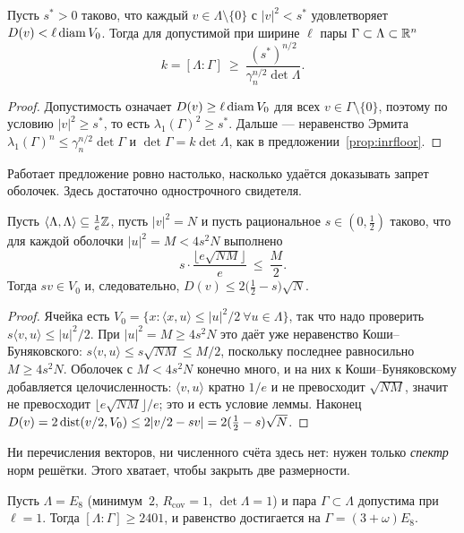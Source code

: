 \begin{proposition}\label{prop:shellfloor}
\stP{} Пусть $s^{\ast}>0$ таково, что каждый $v\in\Lambda\setminus\{0\}$ с
$|v|^2<s^{\ast}$ удовлетворяет $D(v)<\ell\operatorname{diam} V_0$. Тогда для допустимой при
ширине $\ell$ пары $\Gamma\subset\Lambda\subset\mathbb{R}^n$
\[
k=[\Lambda:\Gamma]\ \ge\ \frac{(s^{\ast})^{n/2}}{\gamma_n^{n/2}\det\Lambda}.
\]
\end{proposition}

\begin{proof}
Допустимость означает $D(v)\ge\ell\operatorname{diam} V_0$ для всех $v\in\Gamma\setminus\{0\}$,
поэтому по условию $|v|^2\ge s^{\ast}$, то есть
$\lambda_1(\Gamma)^2\ge s^{\ast}$. Дальше --- неравенство Эрмита
$\lambda_1(\Gamma)^n\le\gamma_n^{n/2}\det\Gamma$ и $\det\Gamma=k\det\Lambda$,
как в предложении~\ref{prop:inrfloor}.
\end{proof}

Работает предложение ровно настолько, насколько удаётся доказывать запрет
оболочек. Здесь достаточно однострочного свидетеля.

\begin{lemma}\label{lem:radial}
\stP{} Пусть $\langle\Lambda,\Lambda\rangle\subseteq\frac1e\mathbb{Z}$, пусть $|v|^2=N$
и пусть рациональное $s\in(0,\tfrac12)$ таково, что для каждой оболочки
$|u|^2=M<4s^2N$ выполнено
\[
s\cdot\frac{\bigl\lfloor e\sqrt{NM}\bigr\rfloor}{e}\ \le\ \frac M2 .
\]
Тогда $sv\in V_0$ и, следовательно,
$D(v)\le2\bigl(\tfrac12-s\bigr)\sqrt N$.
\end{lemma}

\begin{proof}
Ячейка есть $V_0=\{x:\langle x,u\rangle\le|u|^2/2\ \forall u\in\Lambda\}$, так
что надо проверить $s\langle v,u\rangle\le|u|^2/2$. При $|u|^2=M\ge4s^2N$ это
даёт уже неравенство Коши--Буняковского: $s\langle v,u\rangle\le s\sqrt{NM}\le
M/2$, поскольку последнее равносильно $M\ge4s^2N$. Оболочек с $M<4s^2N$ конечно
много, и на них к Коши--Буняковскому добавляется целочисленность: $\langle
v,u\rangle$ кратно $1/e$ и не превосходит $\sqrt{NM}$, значит не превосходит
$\lfloor e\sqrt{NM}\rfloor/e$; это и есть условие леммы. Наконец
$D(v)=2\operatorname{dist}(v/2,V_0)\le2|v/2-sv|=2(\tfrac12-s)\sqrt N$.
\end{proof}

Ни перечисления векторов, ни численного счёта здесь нет: нужен только
\emph{спектр} норм решётки. Этого хватает, чтобы закрыть две размерности.

\begin{keybox}
\begin{theorem}[$2401$ неулучшаемо на $E_8$]\label{thm:e8opt}
\stP{} Пусть $\Lambda=E_8$ (минимум~$2$, $R_{\mathrm{cov}}=1$,
$\det\Lambda=1$) и пара $\Gamma\subset\Lambda$ допустима при $\ell=1$. Тогда
$[\Lambda:\Gamma]\ge2401$, и равенство достигается на
$\Gamma=(3+\omega)E_8$.
\end{theorem}
\end{keybox}

